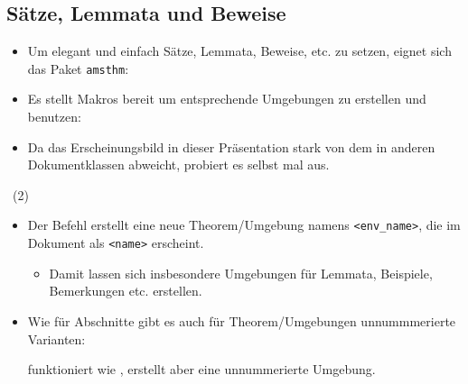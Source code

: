 \subsection{Sätze, Lemmata und Beweise}

\begin{frame}[fragile]{\subsecname}
    \begin{itemize}
        \item Um elegant und einfach Sätze, Lemmata, Beweise, etc. zu setzen, eignet sich das Paket
            \texttt{amsthm}:
            \begin{center}
                \code{\usepackage{amsthm}}
            \end{center}
        \item Es stellt Makros bereit um entsprechende Umgebungen zu erstellen und benutzen:
        \item Da das Erscheinungsbild in dieser Präsentation stark von dem in anderen
            Dokumentklassen abweicht, probiert es selbst mal aus.
    \end{itemize}
\end{frame}

\begin{frame}[fragile]{\subsecname~(2)}
    \begin{itemize}
        \item Der Befehl  erstellt eine neue
            Theorem\-/Umgebung namens \texttt{<env\_name>}, die im Dokument als \texttt{<name>}
            erscheint.
            \begin{itemize}
                \item Damit lassen sich insbesondere Umgebungen für Lemmata, Beispiele, Bemerkungen
                    etc. erstellen.
            \end{itemize}
        \item Wie für Abschnitte gibt es auch für Theorem\-/Umgebungen unnummmerierte Varianten:
            \begin{center}
            \end{center}
            funktioniert wie \code{\newtheorem}, erstellt aber eine unnummerierte Umgebung.
    \end{itemize}
\end{frame}

